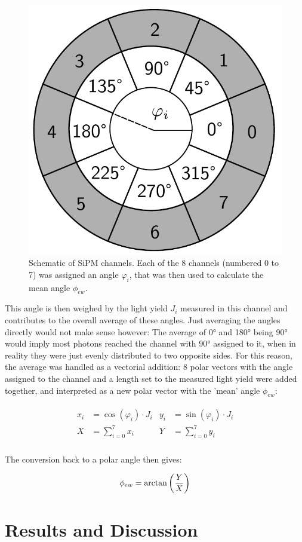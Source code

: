 	\begin{figure}[h]
		\centering
		\includegraphics[width=.3\textwidth]{pictures/phi_channel.pdf}
		\caption{Schematic of \ac{SiPM} channels. Each of the 8 channels (numbered 0 to 7) was assigned an angle $\varphi_i$, that was then used to calculate the mean angle $\phi_{ew}$.}
		\label{fig:channel-phi}
	\end{figure}
	
	This angle is then weighed by the light yield $J_{i}$ measured in this channel and contributes to the overall average of these angles.
	Just averaging the angles directly would not make sense however: The average of 0° and 180° being 90° would imply most photons reached the channel with 90° assigned to it, when in reality they were just evenly distributed to two opposite sides.
    For this reason, the average was handled as a vectorial addition: 8 polar vectors with the angle assigned to the channel and a length set to the measured light yield were added together, and interpreted as a new polar vector with the 'mean' angle $\phi_{ew}$:
    
    \begin{gather}
    	\begin{align*}
    		x_{i}& = \cos(\varphi_{i}) \cdot J_{i} 
    		& y_{i} &= \sin(\varphi_{i}) \cdot J_{i}\\
    		X  &= \sum_{i=0}^{7} x_{i}
    		& Y &= \sum_{i=0}^{7} y_{i}\\
    	\end{align*}
     \end{gather} 
    	
    	The conversion back to a polar angle then gives:
    	
    	\begin{align}
    		\label{eq:phiew}
    		\phi_{ew} = \arctan\qty(\frac{Y}{X})
    	\end{align}
    

\chapter{Results and Discussion}

